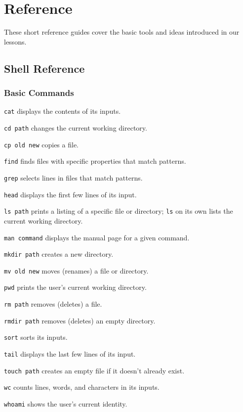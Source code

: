 \chapter{Reference}\label{s:reference}

These short reference guides cover the basic tools and ideas introduced
in our lessons.

\section{Shell Reference}

\subsection*{Basic Commands}

\begin{swcitemize}
\item
  \texttt{cat} displays the contents of its inputs.
\item
  \texttt{cd path} changes the current working directory.
\item
  \texttt{cp old new} copies a file.
\item
  \texttt{find} finds files with specific properties that match
  patterns.
\item
  \texttt{grep} selects lines in files that match patterns.
\item
  \texttt{head} displays the first few lines of its input.
\item
  \texttt{ls path} prints a listing of a specific file or directory;
  \texttt{ls} on its own lists the current working directory.
\item
  \texttt{man command} displays the manual page for a given command.
\item
  \texttt{mkdir path} creates a new directory.
\item
  \texttt{mv old new} moves (renames) a file or directory.
\item
  \texttt{pwd} prints the user's current working directory.
\item
  \texttt{rm path} removes (deletes) a file.
\item
  \texttt{rmdir path} removes (deletes) an empty directory.
\item
  \texttt{sort} sorts its inputs.
\item
  \texttt{tail} displays the last few lines of its input.
\item
  \texttt{touch path} creates an empty file if it doesn't already exist.
\item
  \texttt{wc} counts lines, words, and characters in its inputs.
\item
  \texttt{whoami} shows the user's current identity.
\end{swcitemize}

